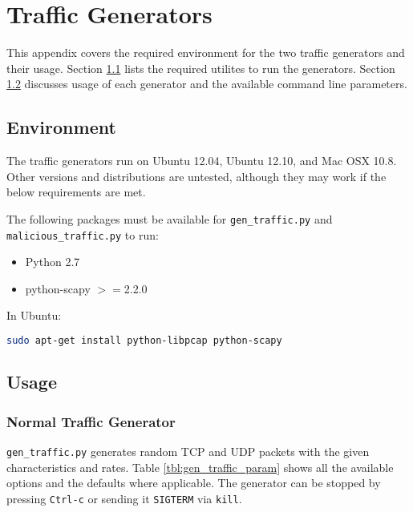 \chapter{Traffic Generators}
\label{chp:generators}

\par This appendix covers the required environment for the two traffic generators and their usage. Section \ref{sec:gen_env} lists the required utilites to run the generators. Section \ref{sec:gen_usage} discusses usage of each generator and the available command line parameters.

\section{Environment}
\label{sec:gen_env}
\par The traffic generators run on Ubuntu 12.04, Ubuntu 12.10, and Mac OSX 10.8. Other versions and distributions are untested, although they may work if the below requirements are met. 

\par The following packages must be available for \texttt{gen\_traffic.py} and \texttt{malicious\_traffic.py} to run:
{\singlespace
\begin{itemize}
\item Python 2.7
\item python-scapy $>=$2.2.0
\end{itemize}
}

\par In Ubuntu:
\begin{lstlisting}[language=bash]
sudo apt-get install python-libpcap python-scapy
\end{lstlisting}

\section{Usage}
\label{sec:gen_usage}
\subsection{Normal Traffic Generator}
\par \texttt{gen\_traffic.py} generates random \ac{TCP} and \ac{UDP} packets with the given characteristics and rates. Table \ref{tbl:gen_traffic_param} shows all the available options and the defaults where applicable. The generator can be stopped by pressing \texttt{Ctrl-c} or sending it \texttt{SIGTERM} via \texttt{kill}.

